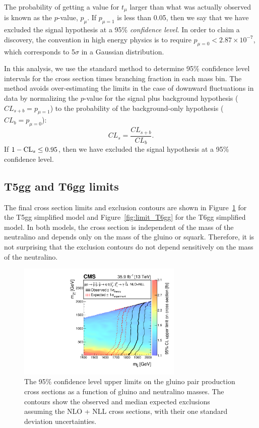 The probability of getting a value for $t_\mu$ larger than what was actually observed is known as the $p$-value, 
$p_\mu$. If $p_{\mu=1}$ is less than 0.05, then we say that we have excluded the signal hypothesis at a 95\% 
\textit{confidence level}. In order to claim a discovery, the convention in high energy physics is to require
$p_{\mu =0} < 2.87 \times 10^{-7}$, which corresponds to 5$\sigma$ in a Gaussian distribution. 

In this analysis, we use the standard \cls method \cite{Junk:1999kv, Read:2002hq} to 
determine 95\% confidence level intervals for the cross section times branching fraction in each mass bin.
The \cls method avoids over-estimating the limits in the case of downward fluctuations in data by
normalizing the $p$-value for the signal plus background hypothesis ($CL_{s+b} = p_{\mu=1}$) to the
probability of the background-only hypothesis ($CL_{b} = p_{\mu=0}$):
\begin{equation}
CL_s = \frac{CL_{s+b}}{CL_{b}}.
\end{equation}
If $1 - \mathrm{CL}_s \leq 0.95$, then we have excluded the signal hypothesis at a 95\% confidence level.

\subsection{T5gg and T6gg limits}
\label{sec:limitResults}

The final cross section limits and exclusion contours are shown in Figure~\ref{fig:limit_T5gg} for the T5gg simplified model
and Figure~\ref{fig:limit_T6gg} for the T6gg simplified model.
In both models, the cross section is independent of the mass of the neutralino and 
depends only on the mass of the gluino or squark. Therefore, it is not surprising that the exclusion contours
do not depend sensitively on the mass of the neutralino. 

\begin{figure}[h]
\begin{center}
\includegraphics[width=0.7\textwidth]{Figures/Results/T5ggXSEC.pdf}
\end{center}
    \caption{The 95\% confidence level upper limits on the gluino pair
        production cross sections as a function of gluino and neutralino masses.
        The contours show the observed and median expected exclusions assuming
        the NLO + NLL cross sections, with their one standard deviation
	uncertainties.}
    \label{fig:limit_T5gg}
\end{figure}

